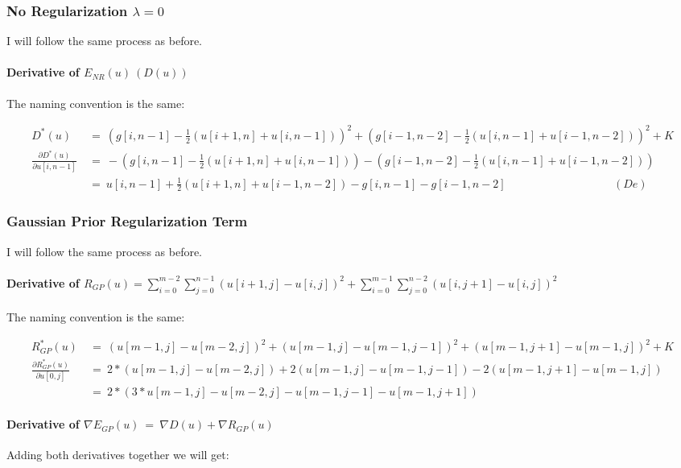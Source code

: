 \documentclass{report}
\begin{document}
			\subsubsection{No Regularization $\lambda = 0$}
			\startsubsection
				I will follow the same process as before.
				\vspace{-0.4cm} \paragraph{Derivative of  $E_{NR}(u) \ (D(u))$}
				\startsubsection
					The naming convention is the same:
				\closesection
				\begin{adjustwidth}{-6em}{}
					\vspace{-0.6cm}
					\begin{align*}
						D^*(u) \ & = \ (g[i,n-1] - \frac{1}{2} (u[i+1,n] + u[i,n-1]))^2 + (g[i-1,n-2] - \frac{1}{2} (u[i,n-1] + u[i-1,n-2]))^2 + K \\
						\frac{\partial D^*(u)}{\partial u[i,n-1]} \ & = \ - (g[i,n-1] - \frac{1}{2} (u[i+1,n] + u[i,n-1])) - (g[i-1,n-2] - \frac{1}{2} (u[i,n-1] + u[i-1,n-2])) \\
						& = \ u[i,n-1]  + \frac{1}{2} (u[i+1,n] + u[i-1,n-2]) - g[i,n-1] - g[i-1,n-2] \hspace{4cm} (De)
					\end{align*}
				\end{adjustwidth}
			\closesection
			\subsubsection{Gaussian Prior Regularization Term}
			\startsubsection
				I will follow the same process as before.
				\vspace{-0.4cm} \paragraph{Derivative of $R_{GP}(u) = \sum_{i=0}^{m-2} \sum_{j=0}^{n-1} ( u[i+1,j] - u[i,j] )^2 + \sum_{i=0}^{m-1} \sum_{j=0}^{n-2} ( u[i,j+1] - u[i,j] )^2$}
				\startsubsection
					\vspace{0.2cm} The naming convention is the same:
				\closesection
				\begin{adjustwidth}{-4em}{}
					\vspace{-0.5cm}
					\begin{align*}
						R_{GP}^*(u) \ & = \ (u[m-1,j] - u[m-2,j])^2 + (u[m-1,j] - u[m-1,j-1])^2 + (u[m-1,j+1] - u[m-1,j])^2 + K \\
						\frac{\partial R_{GP}^*(u)}{\partial u[0,j]} \ & = \ 2 * (u[m-1,j] - u[m-2,j]) + 2 (u[m-1,j] - u[m-1,j-1]) - 2 (u[m-1,j+1] - u[m-1,j]) \\
						& = \ 2 * (3 * u[m-1,j] - u[m-2,j] - u[m-1,j-1] - u[m-1,j+1])
					\end{align*}
				\end{adjustwidth}
				\vspace{-0.4cm} \paragraph{Derivative of $\nabla E_{GP}(u) \ = \ \nabla D(u) + \nabla R_{GP}(u)$}
				\startsubsection
					Adding both derivatives together we will get:
				\closesection
			\closesection
\end{document}
